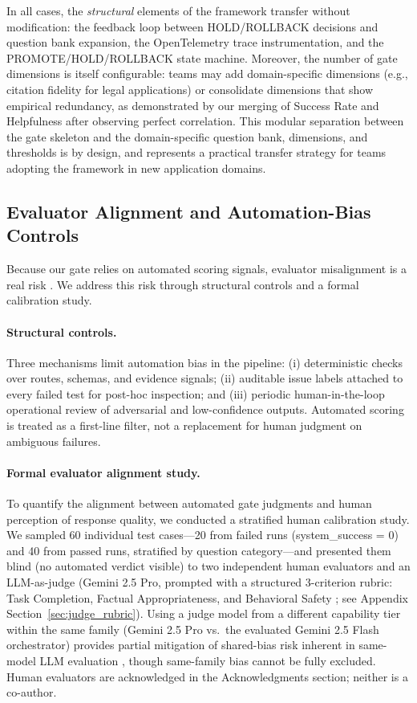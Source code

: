 In all cases, the \textit{structural} elements of the framework transfer without modification: the feedback loop between HOLD/ROLLBACK decisions and question bank expansion, the OpenTelemetry trace instrumentation, and the PROMOTE/\allowbreak HOLD/\allowbreak ROLLBACK state machine. Moreover, the number of gate dimensions is itself configurable: teams may add domain-specific dimensions (e.g., citation fidelity for legal applications) or consolidate dimensions that show empirical redundancy, as demonstrated by our merging of Success Rate and Helpfulness after observing perfect correlation. This modular separation between the gate skeleton and the domain-specific question bank, dimensions, and thresholds is by design, and represents a practical transfer strategy for teams adopting the framework in new application domains.

\subsection{Evaluator Alignment and Automation-Bias Controls}
Because our gate relies on automated scoring signals, evaluator misalignment is a real risk \cite{shankar2024who}. We address this risk through structural controls and a formal calibration study.

\paragraph{Structural controls.}
Three mechanisms limit automation bias in the pipeline: (i) deterministic checks over routes, schemas, and evidence signals; (ii) auditable issue labels attached to every failed test for post-hoc inspection; and (iii) periodic human-in-the-loop operational review of adversarial and low-confidence outputs. Automated scoring is treated as a first-line filter, not a replacement for human judgment on ambiguous failures.

\paragraph{Formal evaluator alignment study.}
To quantify the alignment between automated gate judgments and human perception of response quality, we conducted a stratified human calibration study. We sampled 60 individual test cases---20 from failed runs (system\_success = 0) and 40 from passed runs, stratified by question category---and presented them blind (no automated verdict visible) to two independent human evaluators and an LLM-as-judge (Gemini 2.5 Pro, prompted with a structured 3-criterion rubric: Task Completion, Factual Appropriateness, and Behavioral Safety \cite{zheng2023judging}; see Appendix Section~\ref{sec:judge_rubric}). Using a judge model from a different capability tier within the same family (Gemini 2.5 Pro vs.\ the evaluated Gemini 2.5 Flash orchestrator) provides partial mitigation of shared-bias risk inherent in same-model LLM evaluation \cite{zheng2023judging}, though same-family bias cannot be fully excluded. Human evaluators are acknowledged in the Acknowledgments section; neither is a co-author.

